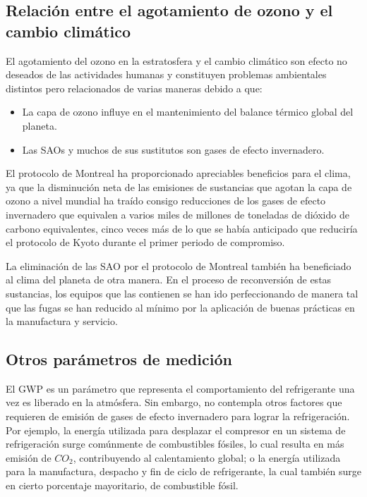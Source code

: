	\subsection{Relación entre el agotamiento de ozono y el cambio climático}

	El agotamiento del ozono en la estratosfera y el cambio climático son efecto no deseados de las actividades humanas y constituyen problemas ambientales distintos pero relacionados de varias maneras debido a que:
	\begin{itemize}
		\item La capa de ozono influye en el mantenimiento del balance térmico global del planeta.
		\item Las SAOs y muchos de sus sustitutos son gases de efecto invernadero.
	\end{itemize}

	El protocolo de Montreal ha proporcionado apreciables beneficios para el clima, ya que la disminución neta de las emisiones de sustancias que agotan la capa de ozono a nivel mundial ha traído consigo reducciones de los gases de efecto invernadero que equivalen a varios miles de millones de toneladas de dióxido de carbono equivalentes, cinco veces más de lo que se había anticipado que reduciría el protocolo de Kyoto durante el primer periodo de compromiso.

	La eliminación de las SAO por el protocolo de Montreal también ha beneficiado al clima del planeta de otra manera. En el proceso de reconversión de estas sustancias, los equipos que las contienen se han ido perfeccionando de manera tal que las fugas se han reducido al mínimo por la aplicación de buenas prácticas en la manufactura y servicio.
	
	\subsection{Otros parámetros de medición}

	El GWP es un parámetro que representa el comportamiento del refrigerante una vez es liberado en la atmósfera. Sin embargo, no contempla otros factores que requieren de emisión de gases de efecto invernadero para lograr la refrigeración. Por ejemplo, la energía utilizada para desplazar el compresor en un sistema de refrigeración surge comúnmente de combustibles fósiles, lo cual resulta en más emisión de $CO_2$, contribuyendo al calentamiento global; o la energía utilizada para la manufactura, despacho y fin de ciclo de refrigerante, la cual también surge en cierto porcentaje mayoritario, de combustible fósil. 

